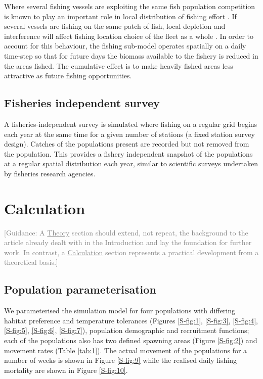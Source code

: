\documentclass[review]{elsarticle}
\begin{document}
Where several fishing vessels are exploiting the same fish population
competition is known to play an important role in local distribution of fishing
effort \cite{Gillis1998}. If several vessels are fishing on the same patch of
fish, local depletion and interference will affect fishing location choice of
the fleet as a whole \cite{Rijnsdorp2000, Poos2007a}. In order to account for
this behaviour, the fishing sub-model operates spatially on a daily time-step
so that for future days the biomass available to the fishery is reduced in the
areas fished. The cumulative effect is to make heavily fished areas less
attractive as future fishing opportunities. 

\subsection{Fisheries independent survey}

A fisheries-independent survey is simulated where fishing on a regular grid
begins each year at the same time for a given number of stations (a fixed
station survey design). Catches of the populations present are recorded but not
removed from the population. This provides a fishery independent snapshot of
the populations at a regular spatial distribution each year, similar to
scientific surveys undertaken by fisheries research agencies. 

\section{Calculation}

\textcolor{gray}{[Guidance: A \underline{Theory} section should extend, not
repeat, the background to the article already dealt with in the	Introduction
and lay the foundation for further work.  In contrast, a
\underline{Calculation} section represents a practical development from a
theoretical basis.] \\}

\subsection{Population parameterisation}

We parameterised the simulation model for four populations with differing
habitat preference and temperature tolerances (Figures \ref{S-fig:1},
\ref{S-fig:3}, \ref{S-fig:4}, \ref{S-fig:5}, \ref{S-fig:6}, \ref{S-fig:7}),
population demographic and recruitment functions; each of the populations also
has two defined spawning areas (Figure \ref{S-fig:2}) and movement rates (Table
\ref{tab:1}). The actual movement of the populations for a number of weeks is
shown in Figure \ref{S-fig:9} while the realised daily fishing mortality are
shown in Figure \ref{S-fig:10}. \\
\end{document}
